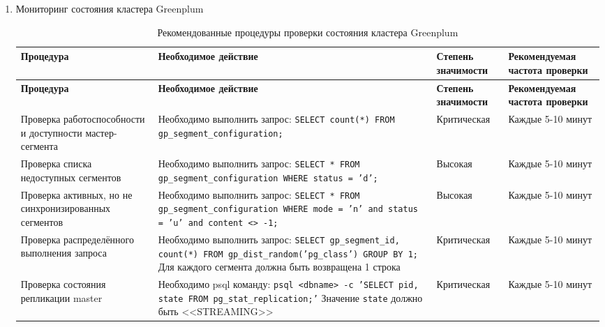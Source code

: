 \begin{enumerate}[1.]
	\item Мониторинг состояния кластера Greenplum
	{\small 
	\begin{longtable}{|p{3.5cm}|p{6.5cm}|p{2.2cm}|p{2.8cm}|}
		\caption{Рекомендованные процедуры проверки состояния кластера Greenplum}
		\label{tab:table_2} \\
		
		\hline
		\textbf{Процедура} & \textbf{Необходимое действие} & \textbf{Степень значимости} & \textbf{Рекомендуемая частота проверки} \\
		\hline
		\endfirsthead
		
		\hline
		\textbf{Процедура} & \textbf{Необходимое действие} & \textbf{Степень значимости} & \textbf{Рекомендуемая частота проверки} \\
		\hline
		\endhead
		
		Проверка работоспособности и доступности мастер-сегмента &
		Необходимо выполнить запрос: \newline
		\texttt{SELECT count(*) FROM gp\_segment\_configuration;} &
		Критическая & Каждые 5-10 минут \\
		\hline
		
		Проверка списка недоступных сегментов &
		Необходимо выполнить запрос: \newline
		\texttt{SELECT * FROM gp\_segment\_configuration WHERE status = 'd';} &
		Высокая & Каждые 5-10 минут \\
		\hline
		
		Проверка активных, но не синхронизированных сегментов &
		Необходимо выполнить запрос: \newline
		\texttt{SELECT * FROM gp\_segment\_configuration WHERE mode = 'n' and status = 'u' and content <> -1;} &
		Высокая & Каждые 5-10 минут \\
		\hline
		
		Проверка распределённого выполнения запроса &
		Необходимо выполнить запрос: \newline
		\texttt{SELECT gp\_segment\_id, count(*) FROM gp\_dist\_random('pg\_class') GROUP BY 1;} \newline
		Для каждого сегмента должна быть возвращена 1 строка &
		Критическая & Каждые 5-10 минут \\
		\hline
		
		Проверка состояния репликации master &
		Необходимо psql команду: \newline
		\texttt{psql <dbname> -c 'SELECT pid, state FROM pg\_stat\_replication;'} \newline
		Значение \texttt{state} должно быть <<STREAMING>> &
		Критическая & Каждые 5-10 минут \\
		\hline
		

\end{longtable}}
\end{enumerate}

